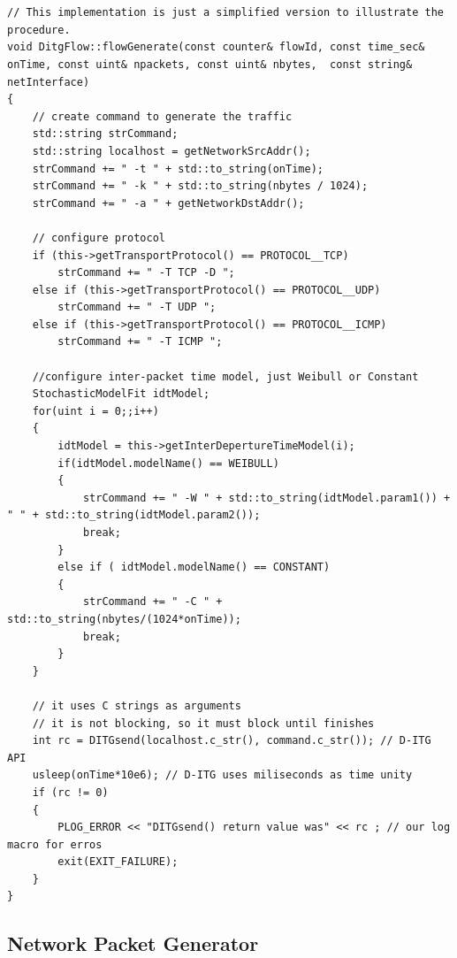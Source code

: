 \begin{verbatim}


// This implementation is just a simplified version to illustrate the procedure.
void DitgFlow::flowGenerate(const counter& flowId, const time_sec& onTime, const uint& npackets, const uint& nbytes,  const string& netInterface)
{
    // create command to generate the traffic
    std::string strCommand;
    std::string localhost = getNetworkSrcAddr(); 
    strCommand += " -t " + std::to_string(onTime); 
    strCommand += " -k " + std::to_string(nbytes / 1024);
    strCommand += " -a " + getNetworkDstAddr();
    
    // configure protocol
    if (this->getTransportProtocol() == PROTOCOL__TCP)
        strCommand += " -T TCP -D ";
    else if (this->getTransportProtocol() == PROTOCOL__UDP)
        strCommand += " -T UDP ";
    else if (this->getTransportProtocol() == PROTOCOL__ICMP)
        strCommand += " -T ICMP ";
        
    //configure inter-packet time model, just Weibull or Constant
    StochasticModelFit idtModel;
    for(uint i = 0;;i++)
    {    
        idtModel = this->getInterDepertureTimeModel(i);
        if(idtModel.modelName() == WEIBULL)
        {
            strCommand += " -W " + std::to_string(idtModel.param1()) + " " + std::to_string(idtModel.param2());
            break;
        }
        else if ( idtModel.modelName() == CONSTANT)
        {
            strCommand += " -C " + std::to_string(nbytes/(1024*onTime));
            break;
        }
    }
    
    // it uses C strings as arguments
    // it is not blocking, so it must block until finishes
    int rc = DITGsend(localhost.c_str(), command.c_str()); // D-ITG API
    usleep(onTime*10e6); // D-ITG uses miliseconds as time unity
    if (rc != 0)
    {
        PLOG_ERROR << "DITGsend() return value was" << rc ; // our log macro for erros
        exit(EXIT_FAILURE);
    }
}
\end{verbatim}


\subsection{Network Packet Generator}


